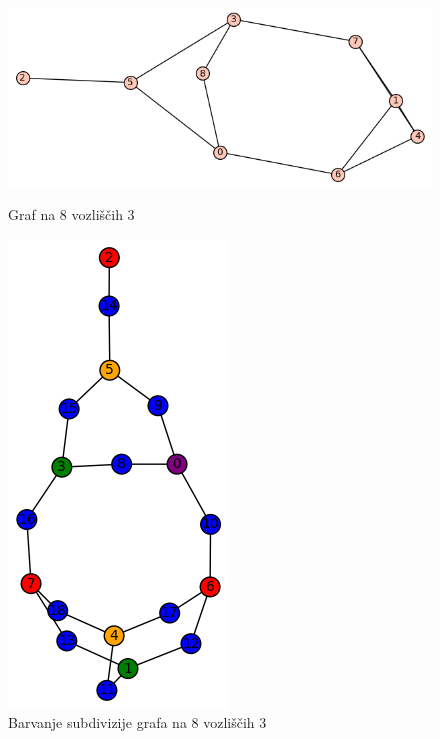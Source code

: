 \documentclass[11pt,a4paper,titlepage]{article}
\begin{document}
\begin{figure}[h]
	\centering
	\begin{minipage}{0.45\textwidth}
		\centering
		\includegraphics[scale=0.5]{orig_8_3.png}
		\caption{Graf na 8 vozliščih 3}
	\end{minipage}
	\hfill
	\begin{minipage}{0.45\textwidth}
		\centering
		\includegraphics[scale=0.7]{sub_8_3.png}
		\caption{Barvanje subdivizije grafa na 8 vozliščih 3}
	\end{minipage}
\end{figure}
\end{document}
